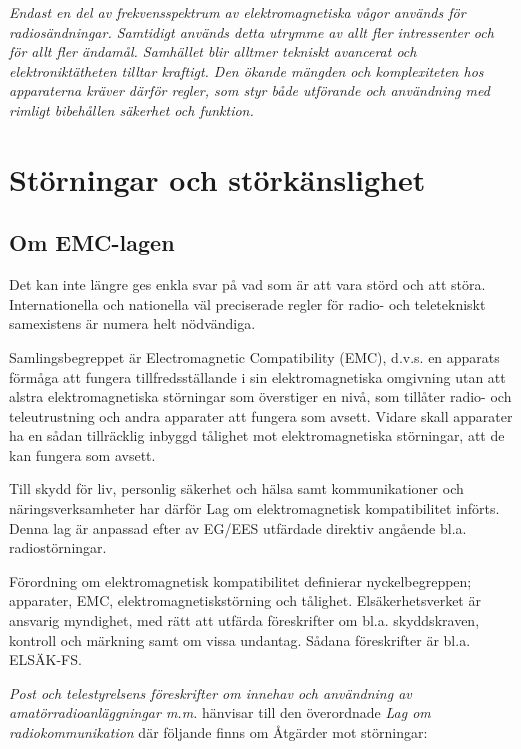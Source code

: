 \emph{Endast en del av frekvensspektrum av elektromagnetiska vågor
  används för radiosändningar. Samtidigt används detta utrymme av allt
  fler intressenter och för allt fler ändamål.  Samhället blir alltmer
  tekniskt avancerat och elektroniktätheten tilltar kraftigt. Den
  ökande mängden och komplexiteten hos apparaterna kräver därför
  regler, som styr både utförande och användning med rimligt
  bibehållen säkerhet och funktion.}

\section{Störningar och störkänslighet}

\subsection{Om EMC-lagen}
\label{EMC-lagen}

Det kan inte längre ges enkla svar på vad som är att vara störd och
att störa. Internationella och nationella väl preciserade regler för
radio- och teletekniskt samexistens är numera helt nödvändiga.

Samlingsbegreppet är Electromagnetic Compatibility (EMC), d.v.s. en
apparats förmåga att fungera tillfredsställande i sin
elektromagnetiska omgivning utan att alstra elektromagnetiska
störningar som överstiger en nivå, som tillåter radio- och
teleutrustning och andra apparater att fungera som avsett.  Vidare
skall apparater ha en sådan tillräcklig inbyggd tålighet mot
elektromagnetiska störningar, att de kan fungera som avsett.

Till skydd för liv, personlig säkerhet och hälsa samt kommunikationer
och näringsverksamheter har därför Lag om elektromagnetisk
kompatibilitet införts. Denna lag är anpassad efter av EG/EES
utfärdade direktiv angående bl.a. radiostörningar.

Förordning om elektromagnetisk kompatibilitet definierar
nyckelbegreppen; apparater, EMC, elektromagnetiskstörning och
tålighet. Elsäkerhetsverket är ansvarig myndighet, med rätt att
utfärda föreskrifter om bl.a. skyddskraven, kontroll och märkning samt
om vissa undantag. Sådana föreskrifter är bl.a. ELSÄK-FS.

\emph{Post och telestyrelsens föreskrifter om innehav och användning
  av amatörradioanläggningar m.m.} hänvisar till den överordnade
\emph{Lag om radiokommunikation} där följande finns om Åtgärder mot
störningar:


